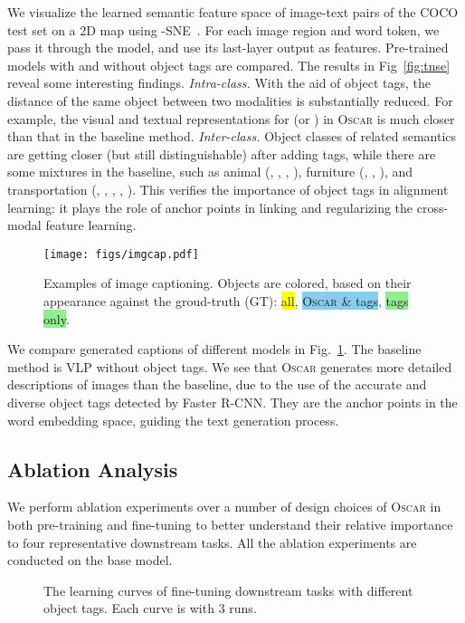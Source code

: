 \documentclass[runningheads]{llncs}
\newcommand{\short}{\textsc{Oscar}}
\begin{document}
We visualize the learned semantic feature space of image-text pairs of the COCO test set on a 2D map using -SNE~\cite{maaten2008visualizing}. For each image region and word token, we pass it through the model, and use its last-layer output as features. Pre-trained models with and without object tags are compared. The results in Fig~\ref{fig:tnse} reveal some interesting findings.
 {\it Intra-class.} With the aid of object tags, the distance of the same object between two modalities is substantially reduced. For example, the visual and textual representations for  (or ) in \short{} is much closer than that in the baseline method.
 {\it Inter-class.}
Object classes of related semantics are getting closer (but still distinguishable) after adding tags, while there are some mixtures in the baseline, such as animal (,  ,  ,  ), furniture (, , ), and transportation (, , , , ). This verifies the importance of object tags in alignment learning: it plays the role of anchor points in linking and regularizing the cross-modal feature learning.

\begin{figure}[t!]
\centering
\texttt{[image: figs/imgcap.pdf]}
\caption{Examples of image captioning. Objects are colored, based on their appearance against the groud-truth (GT): \colorbox{yellow}{all},  \colorbox{skyblue}{\short{} \& tags}, \colorbox{lightgreen}{tags only}. }
\label{fig:imgcap_examples}
\vspace{-4mm}
\end{figure}

We compare generated captions of different models in Fig.~\ref{fig:imgcap_examples}. The baseline method is VLP without object tags. We see that \short{} generates more detailed descriptions of images than the baseline, due to the use of the accurate and diverse object tags detected by Faster R-CNN. They are the anchor points in the word embedding space, guiding the text generation process.




\subsection{Ablation Analysis}
We perform ablation experiments over a number of design choices of \short{} in both pre-training and fine-tuning to better understand their relative importance to four representative downstream tasks. All the ablation experiments are conducted on the base model.

\begin{figure*}[t!]
\centering 
{}
\vspace{-3mm}
\caption{The learning curves of fine-tuning downstream tasks with different object tags. Each curve is with 3 runs.} 
\label{fig:ob_abl} 
\vspace{-2mm}
\end{figure*}
\end{document}
